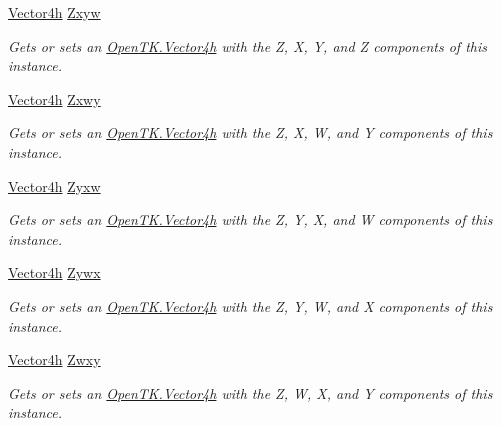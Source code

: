 \begin{DoxyCompactItemize}
\hyperlink{struct_open_t_k_1_1_vector4h}{Vector4h} \hyperlink{struct_open_t_k_1_1_vector4h_a53535428f111b43a9a5c2647873d8cac}{Zxyw}
\begin{DoxyCompactList}\small\item\em Gets or sets an \hyperlink{struct_open_t_k_1_1_vector4h}{Open\-T\-K.\-Vector4h} with the Z, X, Y, and Z components of this instance. \end{DoxyCompactList}\item 
\hyperlink{struct_open_t_k_1_1_vector4h}{Vector4h} \hyperlink{struct_open_t_k_1_1_vector4h_a6d6b767b7c187e6668d1f9b1892e38d8}{Zxwy}
\begin{DoxyCompactList}\small\item\em Gets or sets an \hyperlink{struct_open_t_k_1_1_vector4h}{Open\-T\-K.\-Vector4h} with the Z, X, W, and Y components of this instance. \end{DoxyCompactList}\item 
\hyperlink{struct_open_t_k_1_1_vector4h}{Vector4h} \hyperlink{struct_open_t_k_1_1_vector4h_ab77defecbae32f13f5a0df6dfc1d3880}{Zyxw}
\begin{DoxyCompactList}\small\item\em Gets or sets an \hyperlink{struct_open_t_k_1_1_vector4h}{Open\-T\-K.\-Vector4h} with the Z, Y, X, and W components of this instance. \end{DoxyCompactList}\item 
\hyperlink{struct_open_t_k_1_1_vector4h}{Vector4h} \hyperlink{struct_open_t_k_1_1_vector4h_a1621f00cc69314f89abdccc003bc7246}{Zywx}
\begin{DoxyCompactList}\small\item\em Gets or sets an \hyperlink{struct_open_t_k_1_1_vector4h}{Open\-T\-K.\-Vector4h} with the Z, Y, W, and X components of this instance. \end{DoxyCompactList}\item 
\hyperlink{struct_open_t_k_1_1_vector4h}{Vector4h} \hyperlink{struct_open_t_k_1_1_vector4h_a26b57ad95e2010c6b2087ac814d84381}{Zwxy}
\begin{DoxyCompactList}\small\item\em Gets or sets an \hyperlink{struct_open_t_k_1_1_vector4h}{Open\-T\-K.\-Vector4h} with the Z, W, X, and Y components of this instance. \end{DoxyCompactList}\item 

\end{DoxyCompactItemize}
